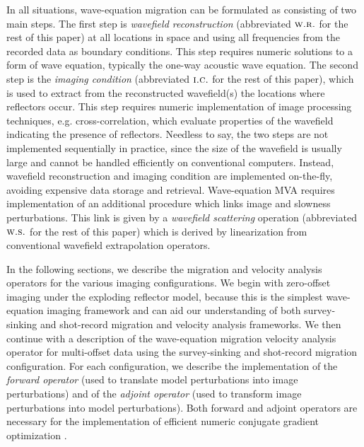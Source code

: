 
In all situations, wave-equation migration can be formulated as
consisting of two main steps. The first step is {\it wavefield
reconstruction} (abbreviated ${\textbf{\sc w.r.}}$ for the rest of this paper) at
all locations in space and using all frequencies from the recorded
data as boundary conditions. This step requires numeric solutions to a
form of wave equation, typically the one-way acoustic wave
equation. The second step is the {\it imaging condition} (abbreviated
${\textbf{\sc i.c.}}$ for the rest of this paper), which is used to extract from the
reconstructed wavefield(s) the locations where reflectors occur. This
step requires numeric implementation of image processing techniques,
e.g. cross-correlation, which evaluate properties of the wavefield
indicating the presence of reflectors. Needless to say, the two steps
are not implemented sequentially in practice, since the size of the
wavefield is usually large and cannot be handled efficiently on
conventional computers. Instead, wavefield reconstruction and imaging
condition are implemented on-the-fly, avoiding expensive data storage
and retrieval. Wave-equation MVA requires implementation of an
additional procedure which links image and slowness
perturbations. This link is given by a {\it wavefield scattering}
operation (abbreviated ${\textbf{\sc w.s.}}$ for the rest of this paper) which is
derived by linearization from conventional wavefield extrapolation
operators.


In the following sections, we describe the migration and velocity
analysis operators for the various imaging configurations. We begin
with zero-offset imaging under the exploding reflector model, because
this is the simplest wave-equation imaging framework and can aid our
understanding of both survey-sinking and shot-record migration and
velocity analysis frameworks. We then continue with a description of
the wave-equation migration velocity analysis operator for
multi-offset data using the survey-sinking and shot-record migration
configuration. For each configuration, we describe the implementation
of the {\it forward operator} (used to translate model perturbations
into image perturbations) and of the {\it adjoint operator} (used to
transform image perturbations into model perturbations). Both forward
and adjoint operators are necessary for the implementation of
efficient numeric conjugate gradient optimization
\cite[]{Claerbout.iei}.
